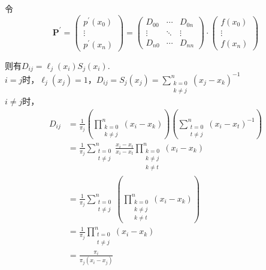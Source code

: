 \documentclass[12pt,a4paper,utf8]{ctexart}
\begin{document}
\begin{enumerate}
令
\begin{equation}
    \mathbf{P^{'}} = \begin{pmatrix}
        p^{'}(x_0)\\
        \vdots \\
        p^{'}(x_n)
    \end{pmatrix} = \begin{pmatrix}
        D_{00} & \cdots & D_{0n} \\
        \vdots & \ddots & \vdots \\
        D_{n0} & \cdots & D_{nn}
    \end{pmatrix} \cdot \begin{pmatrix}
        f(x_0) \\
        \vdots \\
        f(x_n)
    \end{pmatrix}
\end{equation}

则有$D_{ij} = \ell_j(x_i)S_j(x_i)$.\\
$i = j$时，$\ell_j(x_j) = 1$，$D_{ij} = S_j(x_j) = \sum_{\substack{k=0\\k \neq j}}^{n} (x_j-x_k)^{-1}$\\
$i \neq j$时，
\begin{equation}
    \begin{aligned}
        D_{ij} &= \frac{1}{\pi_j} \left(\prod_{\substack{k=0\\k \neq j}}^{n}(x_i-x_k)\right) \left(\sum_{\substack{t=0\\t \neq j}}^{n} (x_i-x_t)^{-1}\right) \\
        &= \frac{1}{\pi_j} \sum_{\substack{t=0\\t \neq j}}^{n} \frac{x_i-x_t}{x_i-x_t} \prod_{\substack{k=0\\k \neq j\\k \neq t}}^{n} (x_i-x_k) \\
        &= \frac{1}{\pi_j} \sum_{\substack{t=0\\t \neq j}}^{n} \left(\prod_{\substack{k=0\\k \neq j\\k \neq t}}^{n} (x_i-x_k) \right)\\
        &= \frac{1}{\pi_j} \prod_{\substack{t=0\\t \neq j}}^{n} (x_i-x_k) \\
        &= \frac{\pi_i}{\pi_j(x_i-x_j)}
    \end{aligned} \nonumber
\end{equation}


\end{enumerate}
\end{document}
